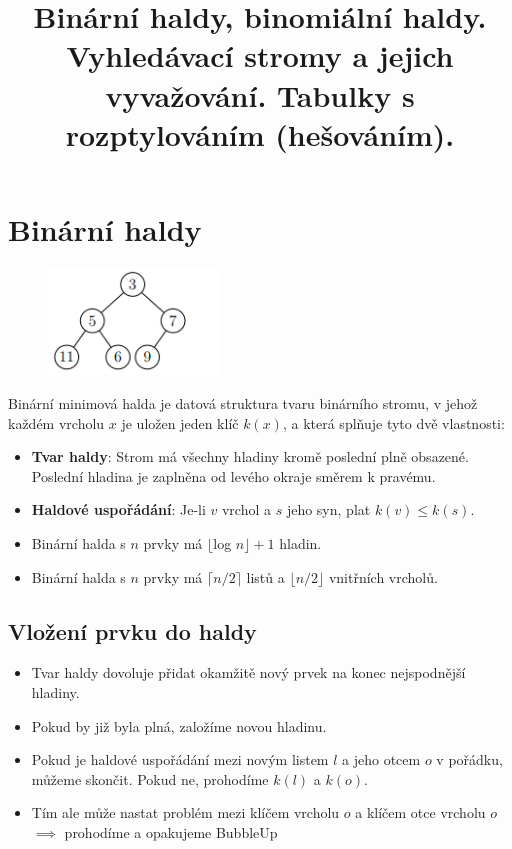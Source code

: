 \documentclass{szzclass}
\title{Binární haldy, binomiální haldy. Vyhledávací stromy a   jejich vyvažování. Tabulky s rozptylováním (hešováním).}
\begin{document}
\maketitle

\tableofcontents
\newpage

\section{Binární haldy}

\begin{figure}[h]
\centering
\includegraphics[width=0.4\textwidth]{topics/bi-spol-5/images/binary-heap.PNG}
\end{figure}

Binární minimová halda je datová struktura tvaru binárního
stromu, v jehož každém vrcholu $x$ je uložen jeden klíč $k(x)$, a která
splňuje tyto dvě vlastnosti:
\begin{itemize}
    \item \textbf{Tvar haldy}: Strom má všechny hladiny kromě poslední plně
    obsazené. Poslední hladina je zaplněna od levého okraje směrem k pravému.
    \item \textbf{Haldové uspořádání}: Je-li $v$ vrchol a $s$ jeho syn, plat $k(v) ≤ k(s)$.
    \item Binární halda s $n$ prvky má $\lfloor $log $ n \rfloor + 1$ hladin.
    \item Binární halda s $n$ prvky má $\lceil n/2\rceil$ listů a $\lfloor n/2 \rfloor$ vnitřních vrcholů.
\end{itemize}

\subsection{Vložení prvku do haldy}
\begin{itemize}
    \item Tvar haldy dovoluje přidat okamžitě nový prvek na konec nejspodnější hladiny.
    \item Pokud by již byla plná, založíme novou hladinu.
    \item Pokud je haldové uspořádání mezi novým listem $l$ a jeho otcem $o$ v pořádku, můžeme skončit. Pokud ne, prohodíme $k(l)$ a $k(o)$.
    \item Tím ale může nastat problém mezi klíčem vrcholu $o$ a klíčem otce vrcholu $o$ $\implies$  prohodíme a opakujeme BubbleUp
\end{itemize}
\end{document}
